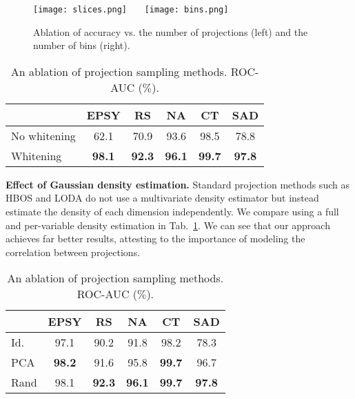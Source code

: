 \documentclass{article}
\begin{document}
\begin{figure*}
  \centering
  \texttt{[image: slices.png]}~~~
  \texttt{[image: bins.png]}
  \caption{Ablation of accuracy vs. the number of projections (left) and the number of bins (right). }
  \label{fig:slice_bin}
  \vspace{5pt}
\end{figure*}

\begin{table}
\caption{An ablation of projection sampling methods. ROC-AUC  ($\%$).}
\centering
\begin{tabular}{lccccc}
\toprule

	&	EPSY	&	RS	&	NA	&	CT	&	SAD	\\ \midrule

No whitening	&	62.1	&	70.9	&	93.6	&	98.5	&	78.8 \\
Whitening	&	\textbf{98.1}	&	\textbf{92.3}	&	\textbf{96.1}	&	\textbf{99.7}	&	\textbf{97.8}	\\ 

\bottomrule
\end{tabular}
\label{tab:ablation_cov}
\end{table}

\textbf{Effect of Gaussian density estimation.} Standard projection methods such as HBOS \cite{goldstein2012histogram} and LODA \cite{pevny2016loda} do not use a multivariate density estimator but instead estimate the density of each dimension independently. We compare using a full and per-variable density estimation in Tab.~\ref{tab:ablation_cov}. We can see that our approach achieves far better results, attesting to the importance of modeling the correlation between projections.  






\begin{table}
\caption{An ablation of projection sampling methods. ROC-AUC  ($\%$).}
\centering
\begin{tabular}{lccccc}
\toprule
&	EPSY	&	RS	&	NA	&	CT	&	SAD	\\ \midrule
Id.	&	97.1	&	90.2	&	91.8	&	98.2	&	78.3	\\
PCA	&	\textbf{98.2}	&	91.6	&	95.8	&	\textbf{99.7}	&	96.7	\\
Rand	&	98.1	&	\textbf{92.3}	&	\textbf{96.1}	&	\textbf{99.7}	&	\textbf{97.8}	\\

\bottomrule
\end{tabular}
\label{tab:ablation_proj}
\end{table}
\end{document}
